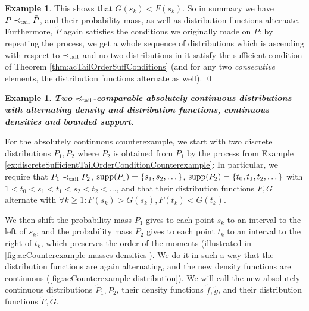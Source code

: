 \documentclass[a4paper]{scrreprt}
\theoremstyle{definition}
\newtheorem{ex}[thm]{Example} %
\begin{document}
\begin{ex}
        This shows that $G(s_k) < F(s_k)$. 
        So in summary we have $P \prec_{\text{tail}} \tilde{P}$, and their probability mass, as well as distribution functions alternate.
        Furthermore, $\tilde{P}$ again satisfies the conditions we originally made on $P$: by repeating the process, we get a whole sequence of distributions which is ascending with respect to $\prec_{\text{tail}}$ and no two distributions in it satisfy the sufficient condition of Theorem \ref{thm:acTailOrderSuffConditions} (and for any two \emph{consecutive} elements, the distribution functions alternate as well).
        \qed
    \end{ex}

    \begin{ex}
        \textbf{
            \textsl{Two $\preccurlyeq_{\text{tail}}$-comparable absolutely continuous distributions with alternating density and distribution functions, continuous densities and bounded support.}
        }
        
        \label{ex:acSufficientTailOrderConditionCounterexample}
        For the absolutely continuous counterexample, we start with two discrete distributions $P_1, P_2$ where $P_2$ is obtained from $P_1$ by the process from Example \ref{ex:discreteSufficientTailOrderConditionCounterexample}: In particular, we require that $P_1 \prec_{\text{tail}} P_2$, $\operatorname{supp}(P_1) = \{s_1, s_2, \dots\}$, $\operatorname{supp}(P_2) = \{t_0, t_1, t_2, \dots\}$ with $1 < t_0 < s_1 < t_1 < s_2 < t_2 < \dots$, and that their distribution functions $F, G$ alternate with $\forall k \geq 1: F(s_k) > G(s_k), F(t_k) < G(t_k)$.
        
        We then shift the probability mass $P_1$ gives to each point $s_k$ to an interval to the left of $s_k$, and the probability mass $P_2$ gives to each point $t_k$ to an interval to the right of $t_k$, which preserves the order of the moments (illustrated in \autoref{fig:acCounterexample-masses-densities}). We do it in such a way that the distribution functions are again alternating, and the new density functions are continuous (\autoref{fig:acCounterexample-distribution}). We will call the new absolutely continuous distributions $\tilde{P}_1, \tilde{P}_2$, their density functions $\tilde{f}, \tilde{g}$, and their distribution functions $\tilde{F}, \tilde{G}$.
        

\end{ex}
\end{document}
